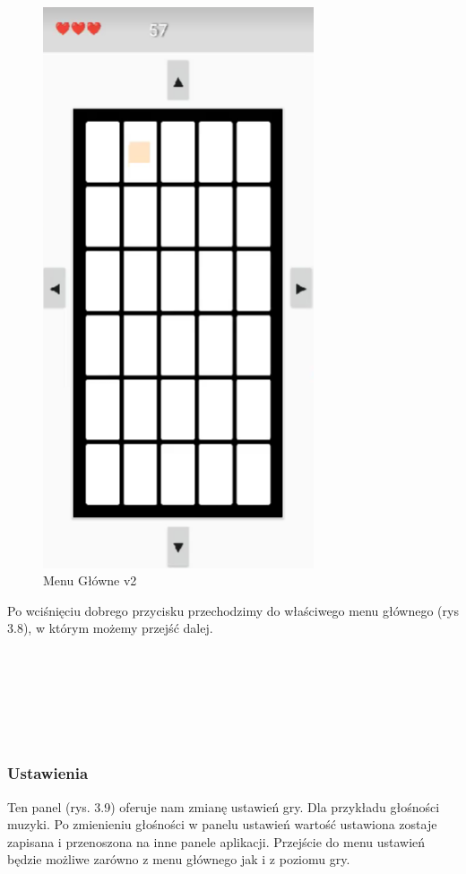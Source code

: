 	\begin{figure}[!htb]
	\begin{center}
		\includegraphics[width=8cm]{rys/menu12.png}
		\caption{Menu Główne v2}
		\label{rys:rysunek001}
	\end{center}
\end{figure}

\hspace{-0.60cm}Po wciśnięciu dobrego przycisku przechodzimy do właściwego menu głównego (rys 3.8), w którym możemy przejść dalej.
\\
\\
\\
\\
\\
\\
\\

\subsubsection{Ustawienia}
Ten panel (rys. 3.9) oferuje nam zmianę ustawień gry. Dla przykładu głośności muzyki. Po zmienieniu głośności w panelu ustawień wartość ustawiona zostaje zapisana i przenoszona na inne panele aplikacji. Przejście do menu ustawień będzie możliwe zarówno z menu głównego jak i z poziomu gry.
	
